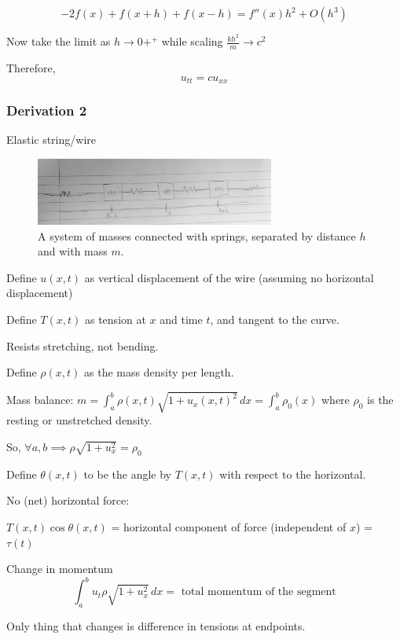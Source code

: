 \documentclass[main.tex]{subfiles}
\begin{document}
$$-2f(x) + f(x+h) + f(x-h) = f''(x)h^2 + O(h^3)$$

Now take the limit as $h\rightarrow 0+^+$ while scaling $\frac{kh^2}{m} \rightarrow c^2$

Therefore,
\begin{equation}
    u_{tt} = cu_{xx}
\end{equation}

\subsubsection{Derivation 2}

Elastic string/wire
\begin{figure}[ht]
        \centering
        \includegraphics[width=0.7\textwidth]{wave-eq-mass-spring}
        \caption{A system of masses connected with springs, separated by distance $h$ and with mass $m$.}
        \label{fig:discrete-mass-spring-wave}
\end{figure}

Define $u(x, t)$ as vertical displacement of the wire (assuming no horizontal displacement)

Define $T(x, t)$ as tension at $x$ and time $t$, and tangent to the curve.

Resists stretching, not bending.

Define $\rho(x, t)$ as the mass density per length.

Mass balance: $m = \int_a^b \rho(x, t)\sqrt{1+u_x{(x,t)}^2}\,dx = \int_a^b \rho_0(x)$ where $\rho_0$ is the resting or unstretched density.

So, $\forall a, b\implies\rho\sqrt{1+u_x^2} = \rho_0$

Define $\theta(x, t)$ to be the angle by $T(x, t)$ with respect to the horizontal.

No (net) horizontal force:

$T(x, t)\cos{\theta(x, t)}$ = horizontal component of force (independent of $x$) = $\tau(t)$

Change in momentum
$$\int_a^b u_t\rho\sqrt{1+u_x^2}\,dx = \textrm{ total momentum of the segment}$$

Only thing that changes is difference in tensions at endpoints.
\end{document}
